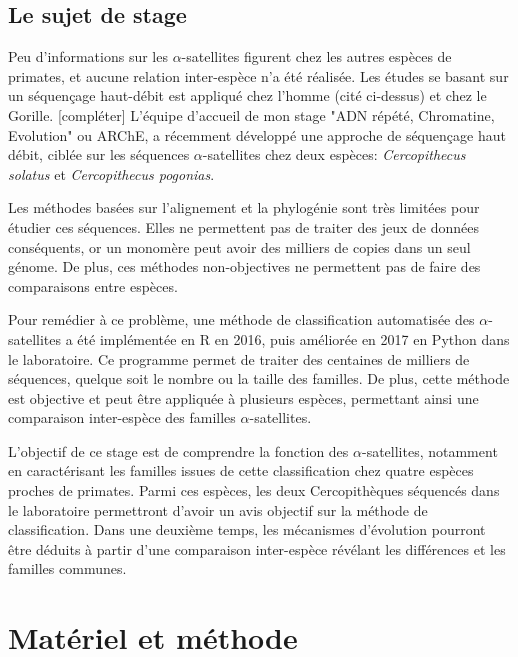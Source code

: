 \documentclass[12pt,a4paper]{article}
\begin{document}
\subsection{Le sujet de stage}

Peu d'informations sur les $\alpha$-satellites figurent chez les autres espèces de primates, et aucune relation inter-espèce n'a été réalisée. Les études se basant sur un séquençage haut-débit est appliqué chez l'homme (cité ci-dessus) et chez le Gorille. [compléter] L'équipe d'accueil de mon stage "ADN répété, Chromatine, Evolution" ou ARChE, a récemment développé une approche de séquençage haut débit, ciblée sur les séquences $\alpha$-satellites chez deux espèces: \textit{Cercopithecus solatus} et \textit{Cercopithecus pogonias}.

Les méthodes basées sur l'alignement et la phylogénie sont très limitées pour étudier ces séquences. Elles ne permettent pas de traiter des jeux de données conséquents, or un monomère peut avoir des milliers de copies dans un seul génome. De plus, ces méthodes non-objectives ne permettent pas de faire des comparaisons entre espèces.

Pour remédier à ce problème, une méthode de classification automatisée des $\alpha$-satellites a été implémentée en R en 2016, puis améliorée en 2017 en Python dans le laboratoire. Ce programme permet de traiter des centaines de milliers de séquences, quelque soit le nombre ou la taille des familles. De plus, cette méthode est objective et peut être appliquée à plusieurs espèces, permettant ainsi une comparaison inter-espèce des familles $\alpha$-satellites. 

L'objectif de ce stage est de comprendre la fonction des $\alpha$-satellites, notamment en caractérisant les familles issues de cette classification chez quatre espèces proches de primates. Parmi ces espèces, les deux Cercopithèques séquencés dans le laboratoire permettront d'avoir un avis objectif sur la méthode de classification.  Dans une deuxième temps, les mécanismes d'évolution pourront être déduits à partir d'une comparaison inter-espèce révélant les différences et les familles communes. 

\section{Matériel et méthode}
\end{document}
